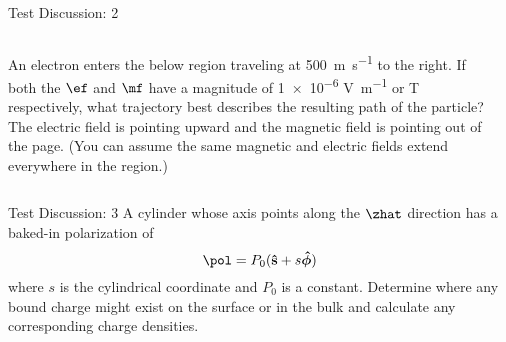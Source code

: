 \documentclass[pdf,aspectratio=169]{beamer}
\begin{document}
\begin{frame}{Test Discussion: 2}
	\begin{columns}
		An electron enters the below region traveling at \SI{500}{\m\per\s} to the right. If both the $\ef$ and $\mf$ have a magnitude of \num{1e-6} \si{\volt\per\meter} or \si{\tesla} respectively, what trajectory best describes the resulting path of the particle? The electric field is pointing upward and the magnetic field is pointing out of the page. (You can assume the same magnetic and electric fields extend everywhere in the region.)
		
		\begin{center}
		\end{center}
	\end{columns}
\end{frame}

\begin{frame}{Test Discussion: 3}
		A cylinder whose axis points along the $\zhat$ direction has a baked-in polarization of 
		\[\pol = P_0 (\vu{s} + s \vu*{\phi})\]
		where $s$ is the cylindrical coordinate and $P_0$ is a constant. Determine where any bound charge might exist on the surface or in the bulk and calculate any corresponding charge densities.
		\begin{flushleft}
		\end{flushleft}
\end{frame}
\end{document}
